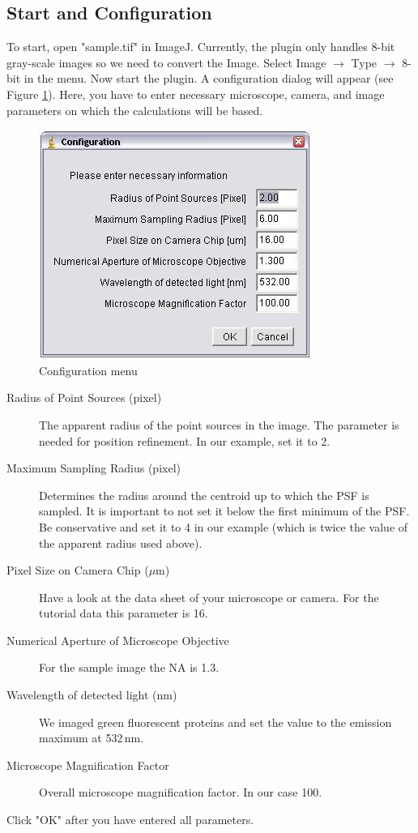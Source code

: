 \subsection{Start and Configuration}
To start, open "sample.tif" in ImageJ. Currently, the plugin only handles 8-bit gray-scale images so we need to convert the Image. Select Image $\rightarrow$ Type $\rightarrow$ 8-bit in the menu.
Now start the plugin. A configuration dialog will appear (see Figure \ref{config}). Here, you have to enter necessary microscope, camera, and image parameters on which the calculations will be based.
\begin{figure}
\centering
\includegraphics[scale=0.7]{config.jpg}
\caption{Configuration menu}
\label{config}
\end{figure}

\begin{description}
\item[Radius of Point Sources (pixel)] The apparent radius of the point sources in the image. The parameter is needed for position refinement. In our example, set it to 2.
\item[Maximum Sampling Radius (pixel)] Determines the radius around the centroid up to which the PSF is sampled. It is important to not set it below the first minimum of the PSF. Be conservative and set it to 4 in our example (which is twice the value of the apparent radius used above).
\item[Pixel Size on Camera Chip ($\mu$m)] Have a look at the data sheet of your microscope or camera. For the tutorial data this parameter is 16.
\item[Numerical Aperture of Microscope Objective] For the sample image the NA is 1.3.
\item[Wavelength of detected light (nm)] We imaged green fluorescent proteins and set the value to the emission maximum at 532\,nm.
\item[Microscope Magnification Factor] Overall microscope magnification factor. In our case 100.
\end{description}
Click "OK" after you have entered all parameters.

